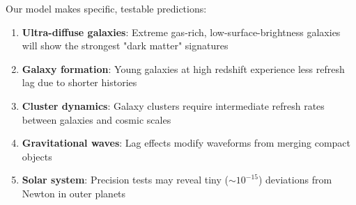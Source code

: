\documentclass[twocolumn,prd,amsmath,amssymb,aps,superscriptaddress,nofootinbib]{revtex4-2}
\begin{document}
Our model makes specific, testable predictions:

\begin{enumerate}
\item \textbf{Ultra-diffuse galaxies}: Extreme gas-rich, low-surface-brightness galaxies will show the strongest "dark matter" signatures
\item \textbf{Galaxy formation}: Young galaxies at high redshift experience less refresh lag due to shorter histories
\item \textbf{Cluster dynamics}: Galaxy clusters require intermediate refresh rates between galaxies and cosmic scales
\item \textbf{Gravitational waves}: Lag effects modify waveforms from merging compact objects
\item \textbf{Solar system}: Precision tests may reveal tiny ($\sim 10^{-15}$) deviations from Newton in outer planets
\end{enumerate}
\end{document}
